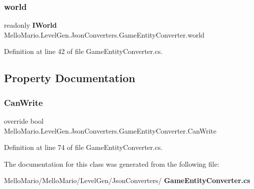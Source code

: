 \subsubsection{world}
{\footnotesize\ttfamily readonly \textbf{ I\+World} Mello\+Mario.\+Level\+Gen.\+Json\+Converters.\+Game\+Entity\+Converter.\+world\hspace{0.3cm}{\ttfamily [private]}}



Definition at line 42 of file Game\+Entity\+Converter.\+cs.



\subsection{Property Documentation}
\mbox{\label{classMelloMario_1_1LevelGen_1_1JsonConverters_1_1GameEntityConverter_a82b34fee963f410314f8aaf33b0c57ca}} 
\subsubsection{Can\+Write}
{\footnotesize\ttfamily override bool Mello\+Mario.\+Level\+Gen.\+Json\+Converters.\+Game\+Entity\+Converter.\+Can\+Write\hspace{0.3cm}{\ttfamily [get]}}



Definition at line 74 of file Game\+Entity\+Converter.\+cs.



The documentation for this class was generated from the following file\+:\begin{DoxyCompactItemize}
\item 
Mello\+Mario/\+Mello\+Mario/\+Level\+Gen/\+Json\+Converters/\textbf{ Game\+Entity\+Converter.\+cs}\end{DoxyCompactItemize}
